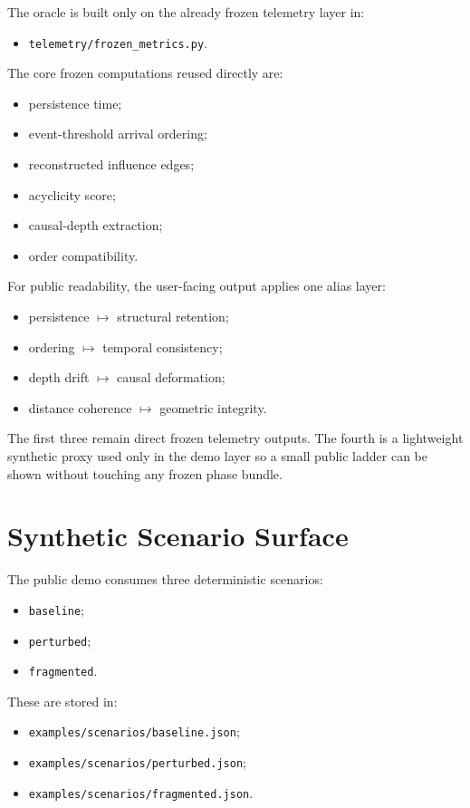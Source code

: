 \documentclass[11pt]{article}
\begin{document}
The oracle is built only on the already frozen telemetry layer in:
\begin{itemize}
\item \texttt{telemetry/frozen\_metrics.py}.
\end{itemize}

The core frozen computations reused directly are:
\begin{itemize}
\item persistence time;
\item event-threshold arrival ordering;
\item reconstructed influence edges;
\item acyclicity score;
\item causal-depth extraction;
\item order compatibility.
\end{itemize}

For public readability, the user-facing output applies one alias layer:
\begin{itemize}
\item persistence $\mapsto$ structural retention;
\item ordering $\mapsto$ temporal consistency;
\item depth drift $\mapsto$ causal deformation;
\item distance coherence $\mapsto$ geometric integrity.
\end{itemize}

The first three remain direct frozen telemetry outputs. The fourth is a lightweight synthetic proxy used only in the demo layer so a small public ladder can be shown without touching any frozen phase bundle.

\section{Synthetic Scenario Surface}

The public demo consumes three deterministic scenarios:
\begin{itemize}
\item \texttt{baseline};
\item \texttt{perturbed};
\item \texttt{fragmented}.
\end{itemize}

These are stored in:
\begin{itemize}
\item \texttt{examples/scenarios/baseline.json};
\item \texttt{examples/scenarios/perturbed.json};
\item \texttt{examples/scenarios/fragmented.json}.
\end{itemize}
\end{document}
